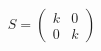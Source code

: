 \documentclass[preview]{standalone}
\begin{document}
\begin{align*}
S = \begin{pmatrix} k & 0 \\ 0 & k \end{pmatrix}
\end{align*}
\end{document}
